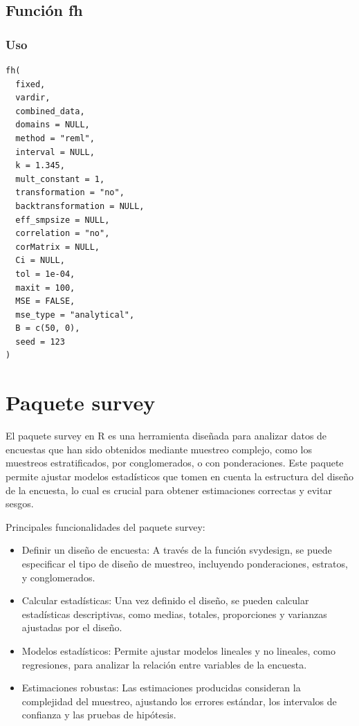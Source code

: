 \documentclass[12pt,spanish]{article}
\begin{document}
\subsection*{Función fh}

\subsubsection*{Uso}
\begin{verbatim}
fh(
  fixed,
  vardir,
  combined_data,
  domains = NULL,
  method = "reml",
  interval = NULL,
  k = 1.345,
  mult_constant = 1,
  transformation = "no",
  backtransformation = NULL,
  eff_smpsize = NULL,
  correlation = "no",
  corMatrix = NULL,
  Ci = NULL,
  tol = 1e-04,
  maxit = 100,
  MSE = FALSE,
  mse_type = "analytical",
  B = c(50, 0),
  seed = 123
)
\end{verbatim}

\section{Paquete survey}

El paquete survey en R es una herramienta diseñada para analizar datos de encuestas que han sido obtenidos mediante muestreo complejo, como los muestreos estratificados, por conglomerados, o con ponderaciones. Este paquete permite ajustar modelos estadísticos que tomen en cuenta la estructura del diseño de la encuesta, lo cual es crucial para obtener estimaciones correctas y evitar sesgos.

Principales funcionalidades del paquete survey:

\begin{itemize}
    \item Definir un diseño de encuesta: A través de la función svydesign, se puede especificar el tipo de diseño de muestreo, incluyendo ponderaciones, estratos, y conglomerados.
    \item Calcular estadísticas: Una vez definido el diseño, se pueden calcular estadísticas descriptivas, como medias, totales, proporciones y varianzas ajustadas por el diseño.
    \item  Modelos estadísticos: Permite ajustar modelos lineales y no lineales, como regresiones, para analizar la relación entre variables de la encuesta.
    \item  Estimaciones robustas: Las estimaciones producidas consideran la complejidad del muestreo, ajustando los errores estándar, los intervalos de confianza y las pruebas de hipótesis.
\end{itemize}
\end{document}
